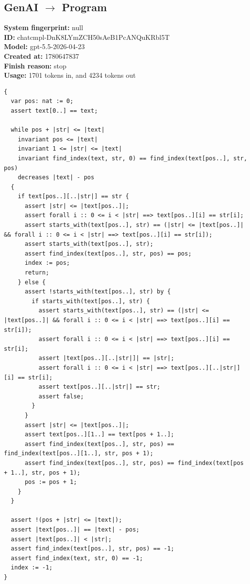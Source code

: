 \documentclass{article}
\begin{document}
\subsection*{GenAI $\rightarrow$ Program}
\textbf{System fingerprint: }null
\\\textbf{ID: }chatcmpl-DnK8LYmZCH50sAeB1PcANQuKRbl5T
\\\textbf{Model: }gpt-5.5-2026-04-23
\\\textbf{Created at: }1780647837
\\\textbf{Finish reason: }stop
\\\textbf{Usage: }1701 tokens in, and 4234 tokens out
\begin{lstlisting}
{
  var pos: nat := 0;
  assert text[0..] == text;

  while pos + |str| <= |text|
    invariant pos <= |text|
    invariant 1 <= |str| <= |text|
    invariant find_index(text, str, 0) == find_index(text[pos..], str, pos)
    decreases |text| - pos
  {
    if text[pos..][..|str|] == str {
      assert |str| <= |text[pos..]|;
      assert forall i :: 0 <= i < |str| ==> text[pos..][i] == str[i];
      assert starts_with(text[pos..], str) == (|str| <= |text[pos..]| && forall i :: 0 <= i < |str| ==> text[pos..][i] == str[i]);
      assert starts_with(text[pos..], str);
      assert find_index(text[pos..], str, pos) == pos;
      index := pos;
      return;
    } else {
      assert !starts_with(text[pos..], str) by {
        if starts_with(text[pos..], str) {
          assert starts_with(text[pos..], str) == (|str| <= |text[pos..]| && forall i :: 0 <= i < |str| ==> text[pos..][i] == str[i]);
          assert forall i :: 0 <= i < |str| ==> text[pos..][i] == str[i];
          assert |text[pos..][..|str|]| == |str|;
          assert forall i :: 0 <= i < |str| ==> text[pos..][..|str|][i] == str[i];
          assert text[pos..][..|str|] == str;
          assert false;
        }
      }
      assert |str| <= |text[pos..]|;
      assert text[pos..][1..] == text[pos + 1..];
      assert find_index(text[pos..], str, pos) == find_index(text[pos..][1..], str, pos + 1);
      assert find_index(text[pos..], str, pos) == find_index(text[pos + 1..], str, pos + 1);
      pos := pos + 1;
    }
  }

  assert !(pos + |str| <= |text|);
  assert |text[pos..]| == |text| - pos;
  assert |text[pos..]| < |str|;
  assert find_index(text[pos..], str, pos) == -1;
  assert find_index(text, str, 0) == -1;
  index := -1;
}
\end{lstlisting}
\end{document}
